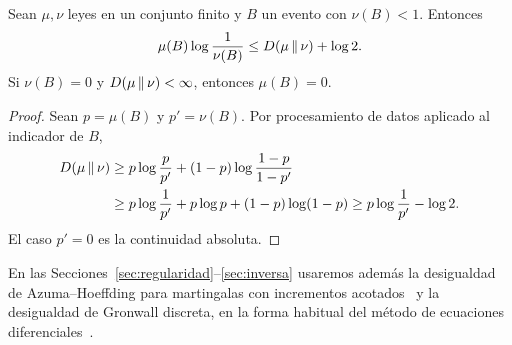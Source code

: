 \begin{lema}\label{lem:binaria}
Sean $\mu,\nu$ leyes en un conjunto finito y $B$ un evento con $\nu(B)<1$. Entonces
\[
 \mu(B)\log\frac1{\nu(B)}\le D(\mu\,\Vert\,\nu)+\log2 .
\]
Si $\nu(B)=0$ y $D(\mu\,\Vert\,\nu)<\infty$, entonces $\mu(B)=0$.
\end{lema}

\begin{proof}
Sean $p=\mu(B)$ y $p'=\nu(B)$. Por procesamiento de datos aplicado al indicador de $B$,
\[
\begin{aligned}
 D(\mu\,\Vert\,\nu)&\ge p\log\frac p{p'}+(1-p)\log\frac{1-p}{1-p'}\\
 &\ge p\log\frac1{p'}+p\log p+(1-p)\log(1-p)\ge p\log\frac1{p'}-\log2 .
\end{aligned}
\]
El caso $p'=0$ es la continuidad absoluta.
\end{proof}

En las Secciones~\ref{sec:regularidad}--\ref{sec:inversa} usaremos además la desigualdad de
Azuma--Hoeffding para martingalas con incrementos acotados~\cite{AlonSpencer} y la desigualdad
de Gronwall discreta, en la forma habitual del método de ecuaciones
diferenciales~\cite{Wormald,Warnke,BennettDudek}.
